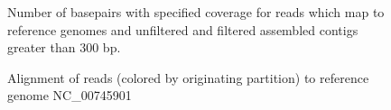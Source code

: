 \documentclass[11pt]{article} %
\begin{document}
\begin{figure}[h!]
\caption{Number of basepairs with specified coverage for reads which map to reference genomes and unfiltered and filtered assembled contigs greater than 300 bp.}
\label{coveragehmp}
\end{figure}

\begin{figure}[h!]
\caption{Alignment of reads (colored by originating partition) to reference genome NC\_00745901}
\label{diginormreference}
\end{figure}
\end{document}
